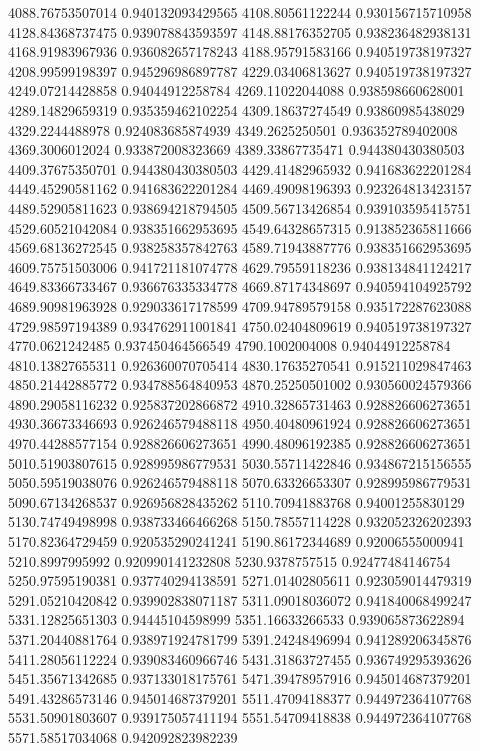 {4088.76753507014 0.940132093429565
4108.80561122244 0.930156715710958
4128.84368737475 0.939078843593597
4148.88176352705 0.938236482938131
4168.91983967936 0.936082657178243
4188.95791583166 0.940519738197327
4208.99599198397 0.945296986897787
4229.03406813627 0.940519738197327
4249.07214428858 0.94044912258784
4269.11022044088 0.938598660628001
4289.14829659319 0.935359462102254
4309.18637274549 0.93860985438029
4329.2244488978 0.924083685874939
4349.2625250501 0.936352789402008
4369.3006012024 0.933872008323669
4389.33867735471 0.944380430380503
4409.37675350701 0.944380430380503
4429.41482965932 0.941683622201284
4449.45290581162 0.941683622201284
4469.49098196393 0.923264813423157
4489.52905811623 0.938694218794505
4509.56713426854 0.939103595415751
4529.60521042084 0.938351662953695
4549.64328657315 0.913852365811666
4569.68136272545 0.938258357842763
4589.71943887776 0.938351662953695
4609.75751503006 0.941721181074778
4629.79559118236 0.938134841124217
4649.83366733467 0.936676335334778
4669.87174348697 0.940594104925792
4689.90981963928 0.929033617178599
4709.94789579158 0.935172287623088
4729.98597194389 0.934762911001841
4750.02404809619 0.940519738197327
4770.0621242485 0.937450464566549
4790.1002004008 0.94044912258784
4810.13827655311 0.926360070705414
4830.17635270541 0.915211029847463
4850.21442885772 0.934788564840953
4870.25250501002 0.930560024579366
4890.29058116232 0.925837202866872
4910.32865731463 0.928826606273651
4930.36673346693 0.926246579488118
4950.40480961924 0.928826606273651
4970.44288577154 0.928826606273651
4990.48096192385 0.928826606273651
5010.51903807615 0.928995986779531
5030.55711422846 0.934867215156555
5050.59519038076 0.926246579488118
5070.63326653307 0.928995986779531
5090.67134268537 0.926956828435262
5110.70941883768 0.94001255830129
5130.74749498998 0.938733466466268
5150.78557114228 0.932052326202393
5170.82364729459 0.920535290241241
5190.86172344689 0.92006555000941
5210.8997995992 0.920990141232808
5230.9378757515 0.92477484146754
5250.97595190381 0.937740294138591
5271.01402805611 0.923059014479319
5291.05210420842 0.939902838071187
5311.09018036072 0.941840068499247
5331.12825651303 0.94445104598999
5351.16633266533 0.939065873622894
5371.20440881764 0.938971924781799
5391.24248496994 0.941289206345876
5411.28056112224 0.939083460966746
5431.31863727455 0.936749295393626
5451.35671342685 0.937133018175761
5471.39478957916 0.945014687379201
5491.43286573146 0.945014687379201
5511.47094188377 0.944972364107768
5531.50901803607 0.939175057411194
5551.54709418838 0.944972364107768
5571.58517034068 0.942092823982239
}
